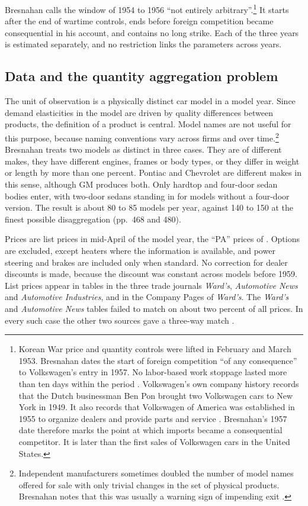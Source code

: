 Bresnahan calls the window of 1954 to 1956 ``not entirely arbitrary''.\footnote{Korean War price and quantity controls
were lifted in February and March 1953. Bresnahan dates the start of foreign competition ``of any consequence'' to
Volkswagen's entry in 1957. No labor-based work stoppage lasted more than ten days within the period
\citep[p.~472, footnote~13]{Bresnahan1987}. Volkswagen's own company history records that the Dutch
businessman Ben Pon brought two Volkswagen cars to New York in 1949. It also records that Volkswagen of America was
established in 1955 to organize dealers and provide parts and service \citep{VolkswagenHistory}. Bresnahan's 1957 date therefore marks the point at which imports became a consequential competitor. It is
later than the first sales of Volkswagen cars in the United States.} It starts after the end of wartime controls,
ends before foreign competition became consequential in his account, and contains no long strike. Each of the three
years is estimated separately, and no restriction links the parameters across years.

\subsection{Data and the quantity aggregation problem}\label{sec:06-bres-data}

The unit of observation is a physically distinct car model in a model year. Since demand elasticities in the model
are driven by quality differences between products, the definition of a product is central. Model names are not
useful for this purpose, because naming conventions vary across firms and over time.\footnote{Independent
manufacturers sometimes doubled the number of model names offered for sale with only trivial changes in the set of
physical products. Bresnahan notes that this was usually a warning sign of impending exit \citep[footnote~8]{Bresnahan1987}.}
Bresnahan treats two models as distinct in three cases. They are of different makes, they have different engines,
frames or body types, or they differ in weight or length by more than one percent. Pontiac and Chevrolet are different
makes in this sense, although GM produces both. Only hardtop and four-door sedan bodies enter, with two-door sedans
standing in for models without a four-door version. The result is about 80 to 85 models per year, against
140 to 150 at the finest possible disaggregation (pp.~468 and 480).

Prices are list prices in mid-April of the model year, the ``PA'' prices of \citet{OhtaGriliches1976}. Options are
excluded, except heaters where the information is available, and power steering and brakes are included only when
standard. No correction for dealer discounts is made, because the discount was constant across models before 1959.
List prices appear in tables in the three trade journals \emph{Ward's}, \emph{Automotive News} and
\emph{Automotive Industries}, and in the Company Pages of \emph{Ward's}. The \emph{Ward's} and \emph{Automotive News}
tables failed to match on about two percent of all prices. In every such case the other two sources gave a three-way
match \citep[p.~480]{Bresnahan1987}.

